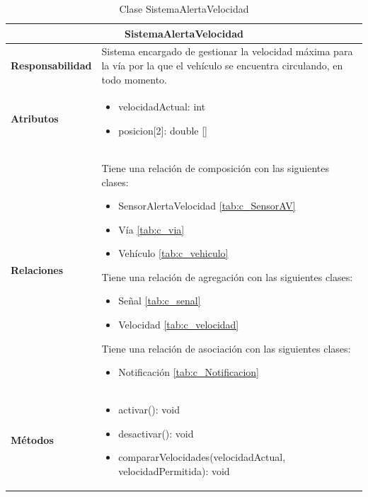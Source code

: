 \begin{table}[H]
\begin{center}
\begin{tabular}{p{} p{11cm}}
\multicolumn{2}{c}{\textbf{SistemaAlertaVelocidad} } \\ \hline \hline
\textbf{Responsabilidad} &  Sistema encargado de gestionar la velocidad máxima para la vía por la que el vehículo se encuentra circulando, en todo momento.  \\ \hline
\textbf{Atributos} & \begin{itemize}
                      \item velocidadActual: int
                      \item posicion[2]: double []
                    \end{itemize}\\ \hline
\textbf{Relaciones} & \par Tiene una relación de composición con las siguientes clases:
                      \begin{itemize}
                        \item SensorAlertaVelocidad \ref{tab:c_SensorAV}
                        \item Vía \ref{tab:c_via}
                        \item Vehículo \ref{tab:c_vehiculo}
                      \end{itemize}

                      \par Tiene una relación de agregación con las siguientes clases:
                      \begin{itemize}
                        \item Señal \ref{tab:c_senal}
                        \item Velocidad \ref{tab:c_velocidad}
                      \end{itemize}

                      \par Tiene una relación de asociación con las siguientes clases:
                      \begin{itemize}
                        \item Notificación \ref{tab:c_Notificacion}
                      \end{itemize}

                      \\ \hline

\textbf{Métodos} &  \begin{itemize}
                      \item activar(): void
                      \item desactivar(): void
                      \item compararVelocidades(velocidadActual, velocidadPermitida): void
                    \end{itemize}\\ \hline
\end{tabular}
\caption{Clase SistemaAlertaVelocidad}
\label{tab:c_SAVelocidad}
\end{center}
\end{table}
